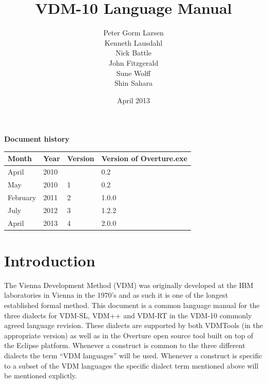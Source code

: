 \documentclass{overturerepchap}
\begin{document}
 
\title{VDM-10 Language Manual}
\author{Peter Gorm Larsen\\
        Kenneth Lausdahl\\
        Nick Battle\\
        John Fitzgerald\\
        Sune Wolff\\
        Shin Sahara}

\date{April 2013}

\maketitle


{\textbf{Document history}}

\begin{tabular}{|l|l|l|l|}\hline
Month   & Year & Version & Version of Overture.exe \\ \hline
April   & 2010 &         & 0.2   \\ \hline
May     & 2010 & 1       & 0.2   \\ \hline
February& 2011 & 2       & 1.0.0 \\ \hline
July    & 2012 & 3       & 1.2.2 \\ \hline
April   & 2013 & 4       & 2.0.0 \\ \hline
\end{tabular}

\tableofcontents
\newpage
\mbox{}
\newpage
{} 
\setcounter{page}{1}

\chapter{Introduction}

The Vienna Development Method (VDM)
\cite{Bjorner&78,Jones90a,Fitzgerald&08c} was originally developed at
the IBM laboratories in Vienna in the 1970's and as such it is one of
the longest established formal method.
This document is a common language manual for the three dialects for
VDM-SL, VDM++ and VDM-RT in the VDM-10 commonly agreed language
revision. These dialects are supported by both VDMTools
\cite{Fitzgerald&08a} (in the appropriate version) as well as in the
Overture open source tool \cite{Larsen&10a} built on top of the
Eclipse platform. Whenever a construct is common to the three
different dialects the term ``VDM languages'' will be used. Whenever a
construct is specific to a subset of the VDM languages the specific
dialect term mentioned above will be mentioned explictly.
\end{document}
